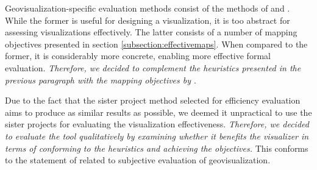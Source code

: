 Geovisualization-specific evaluation methods consist of the methods of \citet{kraak_cartographic_1998} and \citet{schlichtmann_visualization_2002}. While the former is useful for designing a visualization, it is too abstract for assessing visualizations effectively. The latter consists of a number of mapping objectives presented in section \ref{subsection:effectivemaps}. When compared to the former, it is considerably more concrete, enabling more effective formal evaluation. \emph{Therefore, we decided to complement the heuristics presented in the previous paragraph with the mapping objectives by \citet{schlichtmann_visualization_2002}}.

Due to the fact that the sister project method selected for efficiency evaluation aims to produce as similar results as possible, we deemed it unpractical to use the sister projects for evaluating the visualization effectiveness. \emph{Therefore, we decided to evaluate the tool qualitatively by examining whether it benefits the visualizer in terms of conforming to the heuristics and achieving the objectives.} This conforms to the statement of \citet{kraak_cartographic_1998} related to subjective evaluation of geovisualization.

